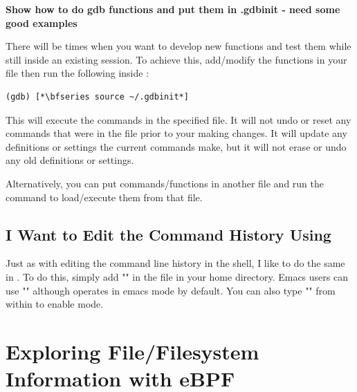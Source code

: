 
\textbf{Show how to do gdb functions and put them in .gdbinit - need some good examples}

There will be times when you want to develop new  functions and test them while still inside an existing  session. To achieve this, add/modify the functions in your  file then run the following inside :

\begin{lstlisting}
(gdb) [*\bfseries source ~/.gdbinit*]
\end{lstlisting}

\noindent
This will execute the commands in the specified file. It will not undo or reset any commands that were in the file prior to your making changes. It will update any definitions or settings the current commands make, but it will not erase or undo any old definitions or settings.

Alternatively, you can put commands/functions in another file and run the  command to load/execute them from that file.



\subsection{I Want to Edit the Command History Using }

Just as with editing the command line history in the shell, I like to do the same in . To do this, simply add "" in the file  in your home directory. Emacs users can use  "" although  operates in emacs mode by default. You can also type "" from within  to enable  mode.


\section{Exploring File/Filesystem Information with eBPF}


